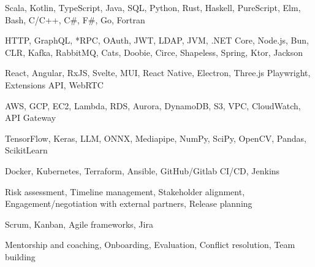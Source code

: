 

\begin{cvhonors}

	{Scala, Kotlin, TypeScript, Java, SQL, Python, Rust, Haskell, PureScript, Elm, Bash, C/C++, C\#, F\#, Go, Fortran}
	{}
	{}

	{HTTP, GraphQL, *RPC, OAuth, JWT, LDAP, JVM, .NET Core, Node.js, Bun, CLR, Kafka, RabbitMQ, Cats, Doobie, Circe, Shapeless, Spring, Ktor, Jackson}
	{}
	{}

	{React, Angular, RxJS, Svelte, MUI, React Native, Electron, Three.js Playwright, Extensions API, WebRTC}
	{}
	{}

	{AWS, GCP, EC2, Lambda, RDS, Aurora, DynamoDB, S3, VPC, CloudWatch, API Gateway}
	{}
	{}

	{TensorFlow, Keras, LLM, ONNX, Mediapipe, NumPy, SciPy, OpenCV, Pandas, ScikitLearn}
	{}
	{}

	{Docker, Kubernetes, Terraform, Ansible, GitHub/Gitlab CI/CD, Jenkins}
	{}
	{}

\end{cvhonors}


\begin{cvhonors}

	{Risk assessment, Timeline management, Stakeholder alignment, Engagement/negotiation with external partners, Release planning}
	{}
	{}

	{Scrum, Kanban, Agile frameworks, Jira}
	{}
	{}

	{Mentorship and coaching, Onboarding, Evaluation, Conflict resolution, Team building}
	{}
	{}

\end{cvhonors}
